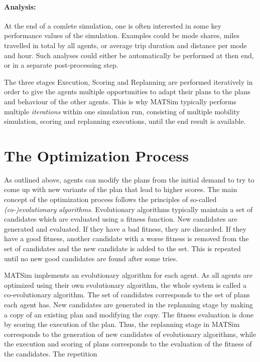 \paragraph{Analysis:}
At the end of a comlete simulation, one is often interested in some key
performance values of the simulation. Examples could be mode shares, miles
travelled in total by all agents, or average trip duration and distance per
mode and hour. Such analyses could either be automatically be performed at then
end, or in a separate post-processing step.


The three stages Execution, Scoring and Replanning are performed iteratively in
order to give the agents multiple opportunities to adapt their plans to the
plans and behaviour of the other agents. This is why MATSim typically performs
multiple \emph{iterations} within one simulation run, consisting of multiple
mobility simulation, scoring and replanning executions, until the end result is
available.


\section{The Optimization Process}
\label{sec:Overview:Optimization}

As outlined above, agents can modify the plans from the initial demand to try to
come up with new variants of the plan that lead to higher scores. The main
concept of the optimization process follows the principles of so-called
\emph{(co-)evolutionary algorithms}. Evolutionary algorithms typically maintain
a set of candidates which are evaluated using a fitness function. New candidates are
generated and evaluated. If they have a bad fitness, they are discarded. If they
have a good fitness, another candidate with a worse fitness is removed from the
set of candidates and the new candidate is added to the set. This is repeated
until no new good candidates are found after some tries.

MATSim implements an evolutionary algorithm for each agent. As all agents are
optimized using their own evolutionary algorithm, the whole system is called a
co-evolutionary algorithm. The set of candidates corresponds to the set of plans
each agent has. New candidates are generated in the replanning stage by making a
copy of an existing plan and modifying the copy. The fitness evaluation is done
by scoring the execution of the plan.
Thus, the replanning stage in MATSim corresponds to the generation of new
candidates of evolutionary algorithms, while the execution and scoring of plans
corresponds to the evaluation of the fitness of the candidates. The repetition 


